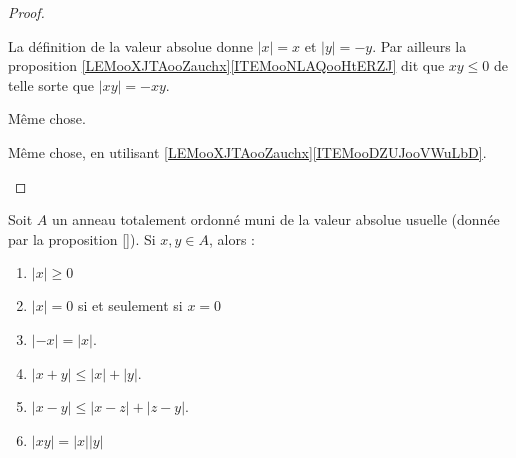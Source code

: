 \begin{proof}
\begin{subproof}
\begin{subproof}
			La définition de la valeur absolue donne \( | x |=x\) et \( | y |=-y\). Par ailleurs la proposition \ref{LEMooXJTAooZauchx}\ref{ITEMooNLAQooHtERZJ} dit que \( xy\leq 0\) de telle sorte que \( | xy |=-xy\).

			Même chose.

			\spitem[Si \( x,y\leq 0\)]
			Même chose, en utilisant \ref{LEMooXJTAooZauchx}\ref{ITEMooDZUJooVWuLbD}.
		\end{subproof}
	\end{subproof}
\end{proof}



\begin{lemma}  \label{LemooANTJooYxQZDw}
	Soit \( A \) un anneau totalement ordonné muni de la valeur absolue usuelle (donnée par la proposition \ref{}). Si \( x,y\in A\),  alors :
	\begin{enumerate}
		\item       \label{ITEMooSDNHooDnjScE}
		      \( | x |\geq 0\)
		\item       \label{ITEMooLQLTooTJTPVM}
		      \( | x |=0\) si et seulement si \( x=0\)
		\item       \label{ITEMooVJAEooOEatzY}
		      \( | -x |=| x |\).
		\item			\label{ItemooOMKNooRlanvk}
		      \( | x+y |\leq | x |+| y |\).
		\item		\label{ITEMooISWFooMeOtjZ}
		      \( | x-y |\leq | x-z |+| z-y |\).
		\item		\label{ITEMooEFMLooYVCuHD}
		      \( | xy |=| x | |y |\)
	\end{enumerate}
\end{lemma}

